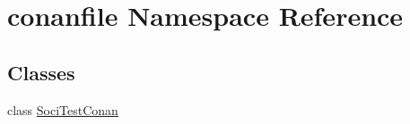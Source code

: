\hypertarget{namespaceconanfile}{}\section{conanfile Namespace Reference}
\label{namespaceconanfile}
\subsection*{Classes}
\begin{DoxyCompactItemize}
\item 
class \hyperlink{classconanfile_1_1_soci_test_conan}{Soci\+Test\+Conan}
\end{DoxyCompactItemize}
